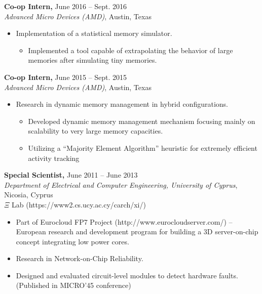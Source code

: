 \documentclass[11pt]{myres} %
\begin{document}
\begin{resume}
{\color{blue}\textbf{Co-op Intern,} June 2016 -- Sept. 2016} \\
\emph{Advanced Micro Devices (AMD)}, Austin, Texas \\
\begin{itemize} \itemsep -2pt
    \item Implementation of a statistical memory simulator.
    \begin{itemize}
    	\item Implemented a tool capable of extrapolating the behavior of large memories after simulating tiny memories.
    \end{itemize}
\end{itemize}

{\color{blue}\textbf{Co-op Intern,} June 2015 -- Sept. 2015} \\
\emph{Advanced Micro Devices (AMD)}, Austin, Texas \\
\begin{itemize} \itemsep -2pt
    \item Research in dynamic memory management in hybrid configurations.
    \begin{itemize}
    	\item Developed dynamic memory management mechanism focusing mainly on scalability to very large memory capacities.
    	\item Utilizing a ``Majority Element Algorithm'' heuristic for extremely efficient activity tracking
    \end{itemize}
\end{itemize}

{\color{blue}\textbf{Special Scientist,} June 2011 -- June 2013} \\
\emph{Department of Electrical and Computer Engineering, University of Cyprus}, Nicosia, Cyprus \\
$\Xi$ Lab (https://www2.cs.ucy.ac.cy/carch/xi/) \\
\begin{itemize} \itemsep -2pt
	\item Part of Eurocloud FP7 Project (http://www.eurocloudserver.com/) -- European research and development program for building a 3D server-on-chip concept integrating low power cores.
	\item Research in Network-on-Chip Reliability.
	\item Designed and evaluated circuit-level modules to detect hardware faults. (Published in MICRO'45 conference)
\end{itemize}


\end{resume}
\end{document}
